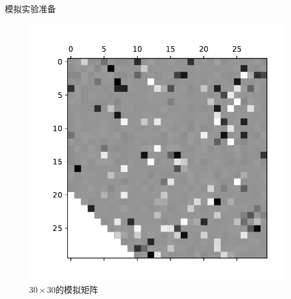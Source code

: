 \begin{frame}{模拟实验准备}
    \begin{figure}[H]
        \centering
        \includegraphics[width=.5\textwidth]{pics/matrix.pdf}
        \caption{\small $30\times30$的模拟矩阵}
        \label{fig2.1}
    \end{figure}
\end{frame}

